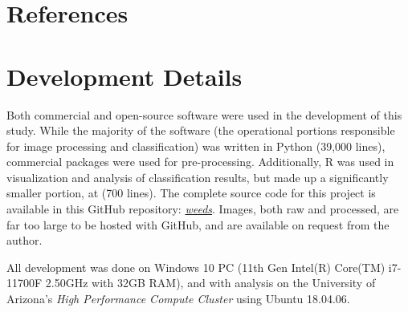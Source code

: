 \documentclass[letterpaper]{report}
\begin{document}
\chapter*{References}
\printbibliography[heading=none]
\appendix
\chapter{Development Details}
Both commercial and open-source software were used in the development of this study. While the majority of the software (the operational portions responsible for image processing and classification) was written in Python (39,000 lines), commercial packages were used for pre-processing. Additionally, R was used in visualization and analysis of classification results, but made up a significantly smaller portion, at (700 lines). The complete source code for this project is available in this GitHub repository: \href{https://github.com/evan-mcginnis/weeds}{\textit {weeds}}. Images, both raw and processed, are far too large to be hosted with GitHub, and are available on request from the author.

All development was done on Windows 10 PC (11th Gen Intel(R) Core(TM) i7-11700F \@ 2.50GHz with 32GB RAM), and  with analysis on the University of Arizona's \textit{High Performance Compute Cluster} using Ubuntu 18.04.06.
\end{document}
